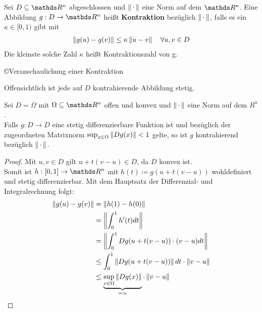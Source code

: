 \begin{Defe}
  Sei $D\subseteq  \R^n $ abgeschlossen und $\left\| \,\cdot\, \right\|$ eine Norm auf dem $\R^n$.
  Eine Abbildung $g:D\rightarrow \R^n $ heißt \textbf{Kontraktion} bezüglich  $\left\| \,\cdot\, \right\|$,
  falls es ein $\kappa \in [0,1)$ gibt mit
  \begin{gather*}
    \left\| g(u)-g(v) \right\| \leq \kappa \left\| u-v \right\| \quad \forall u,v\in D
  \end{gather*}
  Die kleinste solche Zahl $\kappa$ heißt Kontraktionszahl von g.
  
  \begin{image}{\copyright Veranschaulichung einer Kontraktion}
  \end{image}
  \label{im5.2.2}

  
  Offensichtlich ist jede auf $D$ kontrahierende Abbildung stetig.
\end{Defe}  

\begin{Leme}
  \label{5.2.3}
  Sei $D=\overline{\Omega} $ mit $\Omega \subseteq \R^n$ offen und konvex
  und $\left\| \,\cdot\, \right\|$ eine Norm auf dem $R^n$.\\
  Falls $g:D\to D$ eine stetig differenzierbare Funktion ist und
  bezüglich der zugeordneten Matrixnorm $\sup_{x\in \Omega}\left\| Dg(x) \right\|<1$ gelte,
  so ist $g$ kontrahierend bezüglich  $\left\| \,\cdot\, \right\|$.
\end{Leme} 

\begin{proof}
  Mit $u,v \in D$ gilt $u+t(v-u)\in D$, da $D$ konvex ist. \\
  Somit ist $h:[0,1]\rightarrow \R^n $ mit $h(t) \coloneqq g(u+t(v-u))$ wohldefiniert
  und stetig differenzierbar. Mit dem Hauptsatz der Differenzial- und Integralrechnung
  folgt:
  \begin{align}\nonumber
    \left\| g(u)-g(v) \right\| & = \left\| h(1)-h(0) \right\|  \\ \nonumber
                   & = \left\| \int_{0}^{1} h'(t) dt \right\| \\ \nonumber
                   & = \left\| \int_{0}^{1} Dg(u+t(v-u))\cdot (v-u)dt \right\| \\ \nonumber
                   & \leq \int_{0}^{1} \left\| Dg(u+t(v-u)) \right\|dt \cdot \left\| v-u \right\| \\
                   & \leq \underbrace{\sup_{x\in\Omega}\left\| Dg(x) \right\|}_{\eqqcolon \kappa} 
                     \cdot \left\| v-u \right\|
                     \label{V.2.4}
  \end{align}
\end{proof}


